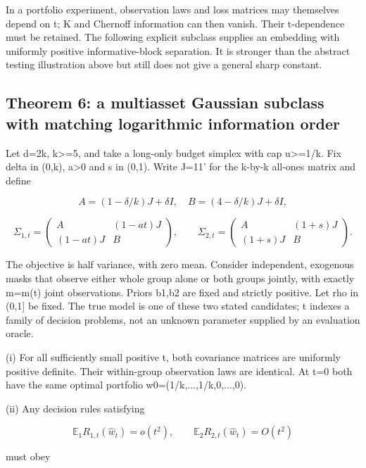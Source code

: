 \documentclass[10pt]{article}
\begin{document}
In a portfolio experiment, observation laws and loss matrices may themselves depend on t; K and Chernoff information can then vanish. Their t-dependence must be retained. The following explicit subclass supplies an embedding with uniformly positive informative-block separation. It is stronger than the abstract testing illustration above but still does not give a general sharp constant.

\subsection*{Theorem 6: a multiasset Gaussian subclass with matching logarithmic information order}

Let d=2k, k>=5, and take a long-only budget simplex with cap u>=1/k. Fix delta in (0,k), a>0 and s in (0,1). Write J=11' for the k-by-k all-ones matrix and define

\[
A=(1-\delta/k)J+\delta I,\quad B=(4-\delta/k)J+\delta I,
\]


\begin{equation}
\Sigma_{1,t}=\begin{pmatrix}A&(1-at)J\\(1-at)J&B\end{pmatrix},\qquad
\Sigma_{2,t}=\begin{pmatrix}A&(1+s)J\\(1+s)J&B\end{pmatrix}.\tag{11}
\end{equation}



The objective is half variance, with zero mean. Consider independent, exogenous masks that observe either whole group alone or both groups jointly, with exactly m=m(t) joint observations. Priors b1,b2 are fixed and strictly positive. Let rho in (0,1] be fixed. The true model is one of these two stated candidates; t indexes a family of decision problems, not an unknown parameter supplied by an evaluation oracle.

(i) For all sufficiently small positive t, both covariance matrices are uniformly positive definite. Their within-group observation laws are identical. At t=0 both have the same optimal portfolio w0=(1/k,...,1/k,0,...,0).

(ii) Any decision rules satisfying

\[
\mathbb E_1 R_{1,t}(\widehat w_t)=o(t^2),\qquad
\mathbb E_2 R_{2,t}(\widehat w_t)=O(t^2)
\]



must obey
\end{document}

